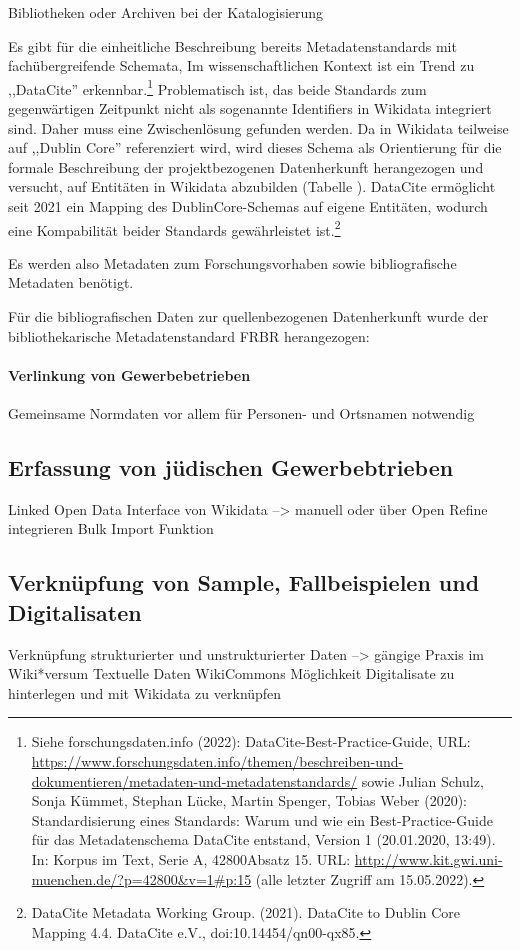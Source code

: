 Bibliotheken oder Archiven bei der Katalogisierung 



Es gibt für die einheitliche Beschreibung bereits Metadatenstandards mit fachübergreifende Schemata,  Im wissenschaftlichen Kontext ist ein Trend zu ,,DataCite'' erkennbar.\footnote{Siehe forschungsdaten.info (2022): DataCite-Best-Practice-Guide, URL: \url{https://www.forschungsdaten.info/themen/beschreiben-und-dokumentieren/metadaten-und-metadatenstandards/} sowie Julian Schulz, Sonja Kümmet, Stephan Lücke, Martin Spenger, Tobias Weber (2020): Standardisierung eines Standards: Warum und wie ein Best-Practice-Guide für das Metadatenschema DataCite entstand, Version 1 (20.01.2020, 13:49). In: Korpus im Text, Serie A, 42800Absatz 15. URL: \url{http://www.kit.gwi.uni-muenchen.de/?p=42800&v=1\#p:15} (alle letzter Zugriff am 15.05.2022).} Problematisch ist, das beide Standards zum gegenwärtigen Zeitpunkt nicht als sogenannte Identifiers in Wikidata integriert sind. Daher muss eine Zwischenlösung gefunden werden. Da in Wikidata teilweise auf ,,Dublin Core'' referenziert wird, wird dieses Schema als Orientierung für die formale Beschreibung der projektbezogenen Datenherkunft herangezogen und versucht, auf Entitäten in Wikidata abzubilden (Tabelle ). DataCite ermöglicht seit 2021 ein Mapping des DublinCore-Schemas auf eigene Entitäten, wodurch eine Kompabilität beider Standards gewährleistet ist.\footnote{DataCite Metadata Working Group. (2021). DataCite to Dublin Core Mapping 4.4. DataCite e.V., doi:10.14454/qn00-qx85.}


Es werden also Metadaten zum Forschungsvorhaben sowie bibliografische Metadaten benötigt.

Für die bibliografischen Daten zur quellenbezogenen Datenherkunft wurde der bibliothekarische Metadatenstandard FRBR herangezogen:
\paragraph{Verlinkung von Gewerbebetrieben}
Gemeinsame Normdaten vor allem für Personen- und Ortsnamen notwendig
\subsection{Erfassung von jüdischen Gewerbebtrieben}
Linked Open Data Interface von Wikidata --> manuell oder über Open Refine integrieren Bulk Import Funktion
\subsection{Verknüpfung von Sample, Fallbeispielen und Digitalisaten}
Verknüpfung strukturierter und unstrukturierter Daten --> gängige Praxis im Wiki*versum
Textuelle Daten
WikiCommons Möglichkeit Digitalisate zu hinterlegen und mit Wikidata zu verknüpfen

